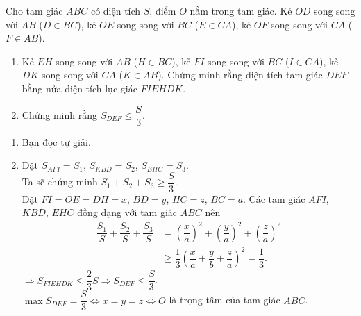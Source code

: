 \begin{bt}%
 Cho tam giác $ABC$ có diện tích $S$, điểm $O$ nằm trong tam giác. Kẻ $OD$ song song với $AB$ ($D \in BC$), kẻ $OE$ song song với $BC$ ($E \in CA$), kẻ $OF$ song song với $CA$ ($F \in AB$).
 \begin{enumerate}
  \item Kẻ $EH$ song song với $AB$ ($H \in BC$), kẻ $FI$ song song với $BC$ ($I \in CA$), kẻ $DK$ song song với $CA$ ($K \in AB$). Chứng minh rằng diện tích tam giác $DEF$ bằng nửa diện tích lục giác $FIEHDK$.
  \item Chứng minh rằng $S_{DEF} \leq \dfrac{S}{3}$.
 \end{enumerate}
 \loigiai
  {
  \immini
  {
  \begin{enumerate}
   \item Bạn đọc tự giải.
   \item Đặt $S_{AFI} = S_1$, $S_{KBD} = S_2$, $S_{EHC} = S_3$.\\
   Ta sẽ chứng minh $S_1 + S_2 + S_3 \geq \dfrac{S}{3}$.\\
   Đặt $FI = OE = DH = x$, $BD = y$, $HC = z$, $BC = a$.
   Các tam giác $AFI$, $KBD$, $EHC$ đồng dạng với tam giác $ABC$ nên
   \begin{align*}
    \dfrac{S_1}{S} + \dfrac{S_2}{S} + \dfrac{S_3}{S} &= \left(\dfrac{x}{a}\right)^2 + \left(\dfrac{y}{a}\right)^2 + \left(\dfrac{z}{a}\right)^2\\
    &\geq \dfrac{1}{3}\left(\dfrac{x}{a} + \dfrac{y}{b} + \dfrac{z}{a}\right)^2 = \dfrac{1}{3}.
   \end{align*}
   $\Rightarrow S_{FIEHDK} \leq \dfrac{2}{3}S \Rightarrow S_{DEF} \leq \dfrac{S}{3}$.\\
   $\max S_{DEF} = \dfrac{S}{3} \Leftrightarrow x=y=z \Leftrightarrow O$ là trọng tâm của tam giác $ABC$.
  \end{enumerate}
  }
  {
  }
  }
\end{bt}





